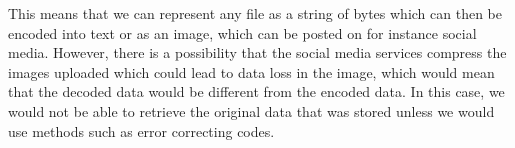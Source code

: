 This means that we can represent any file as a string of bytes which can then be encoded into text or as an image, which can be posted on for instance social media. However, there is a possibility that the social media services compress the images uploaded which could lead to data loss in the image, which would mean that the decoded data would be different from the encoded data. In this case, we would not be able to retrieve the original data that was stored unless we would use methods such as error correcting codes.
